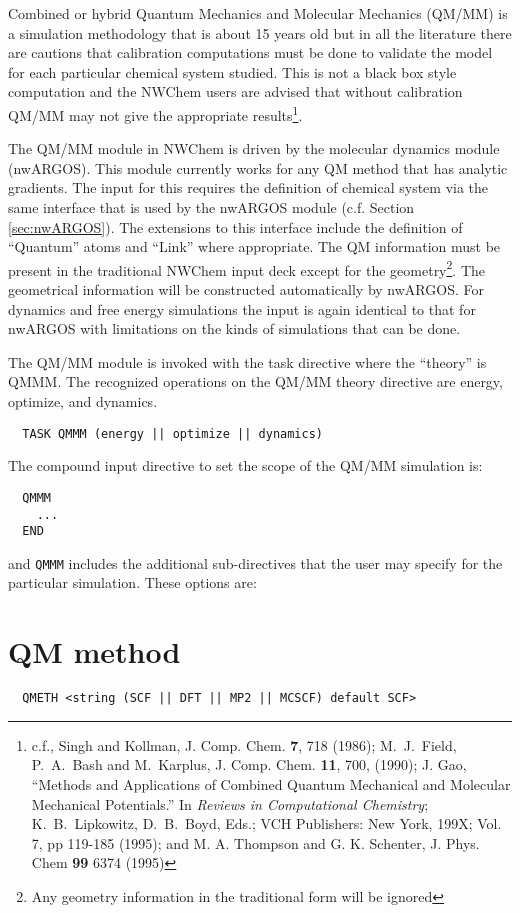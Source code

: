 
\label{sec:qmmm}

Combined or hybrid Quantum Mechanics and Molecular Mechanics (QM/MM)
is a simulation methodology that is about 15 years old but in all the
literature there are cautions that calibration computations must be
done to validate the model for each particular chemical system
studied.  This is not a black box style computation and the NWChem
users are advised that without calibration QM/MM may not give the
appropriate results\footnote{c.f., Singh and Kollman, J. Comp. Chem.
  {\bf 7}, 718 (1986); M.~J.~Field, P.~A.~Bash and M.~Karplus, J.
  Comp. Chem. {\bf 11}, 700, (1990); J. Gao, ``Methods and
  Applications of Combined Quantum Mechanical and Molecular Mechanical
  Potentials.'' In {\it Reviews in Computational Chemistry};
  K.~B.~Lipkowitz, D.~B.~Boyd, Eds.; VCH Publishers: New York, 199X;
  Vol. 7, pp 119-185 (1995); and M. A. Thompson and G. K. Schenter, J.
  Phys. Chem {\bf 99} 6374 (1995) }.

The QM/MM module in NWChem is driven by the molecular dynamics module
(nwARGOS).  This module currently works for any QM method that has
analytic gradients.  The input for this requires the definition of
chemical system via the same interface that is used by the nwARGOS
module (c.f. Section \ref{sec:nwARGOS}).  The extensions to this
interface include the definition of ``Quantum'' atoms and ``Link''
where appropriate.  The QM information must be present in the
traditional NWChem input deck except for the geometry\footnote{Any
  geometry information in the traditional form will be ignored}.  The
geometrical information will be constructed automatically by nwARGOS.
For dynamics and free energy simulations the input is again identical
to that for nwARGOS with limitations on the kinds of simulations that
can be done.

The QM/MM module is invoked with the task directive where the
``theory'' is QMMM.  The recognized operations on the QM/MM theory
directive are energy, optimize, and dynamics.

\begin{verbatim}
  TASK QMMM (energy || optimize || dynamics)
\end{verbatim}

The compound input directive to set the scope of the QM/MM simulation
is: 
\begin{verbatim}
  QMMM
    ...
  END
\end{verbatim}

and \verb+QMMM+ includes the additional sub-directives that the user
may specify for the particular simulation.  These options are:

\section{QM method}
\begin{verbatim}
  QMETH <string (SCF || DFT || MP2 || MCSCF) default SCF>
\end{verbatim}





